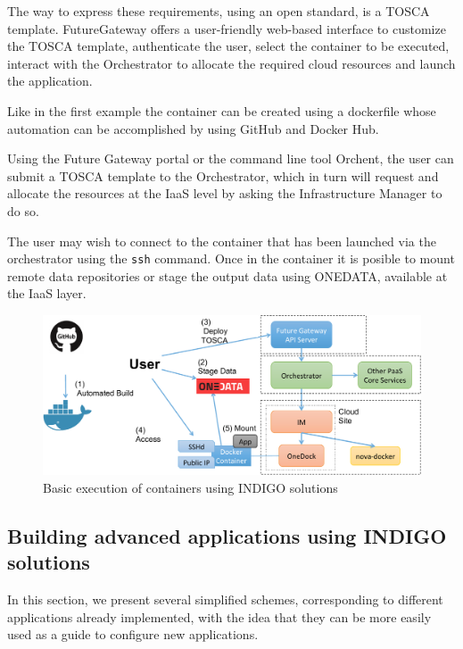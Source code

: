 \documentclass{article}
\begin{document}
\begin{itemize}
The way to express these requirements, using an open standard, is a TOSCA template. FutureGateway offers a user-friendly web-based interface to customize the TOSCA template, authenticate the user, select the container to be executed, interact with the Orchestrator to allocate the required cloud resources and launch the application. 

Like in the first example the container can be created using a dockerfile whose automation can be accomplished by using GitHub and Docker Hub.


Using the Future Gateway portal or the command line tool Orchent, the user can submit a TOSCA template to the Orchestrator, which in turn will request and allocate the resources at the IaaS level by asking the Infrastructure Manager to do so.

The user may wish to connect to the container that has been launched via the orchestrator using the {\tt ssh} command. Once in the container it is posible to mount remote data repositories or stage the output data using ONEDATA, available at the IaaS layer.

\end{itemize}


\begin{figure}
  \centering
  \includegraphics[width=\textwidth]{./figs/Figure12.pdf}
  \caption{Basic execution of containers using INDIGO solutions}
  \label{fig:12}
\end{figure}



\subsection{Building advanced applications using INDIGO solutions}


In this section, we present several simplified schemes, corresponding to different applications already implemented, with the idea that they can be more easily used as a guide to configure new applications.  
\end{document}
